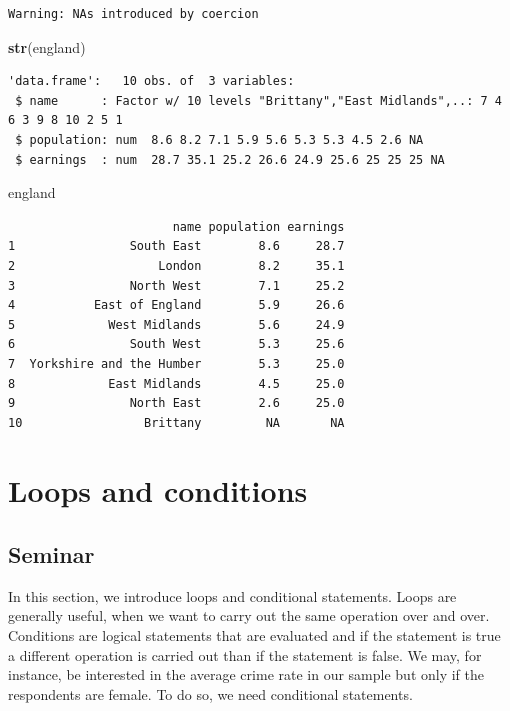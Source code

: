 \documentclass[]{article}
\newenvironment{Shaded}{\begin{snugshade}}{\end{snugshade}}
\newcommand{\KeywordTok}[1]{\textcolor[rgb]{0.13,0.29,0.53}{\textbf{#1}}}
\newcommand{\NormalTok}[1]{#1}
\begin{document}
\begin{verbatim}
Warning: NAs introduced by coercion
\end{verbatim}

\begin{Shaded}
\begin{Highlighting}[]
\KeywordTok{str}\NormalTok{(england)}
\end{Highlighting}
\end{Shaded}

\begin{verbatim}
'data.frame':   10 obs. of  3 variables:
 $ name      : Factor w/ 10 levels "Brittany","East Midlands",..: 7 4 6 3 9 8 10 2 5 1
 $ population: num  8.6 8.2 7.1 5.9 5.6 5.3 5.3 4.5 2.6 NA
 $ earnings  : num  28.7 35.1 25.2 26.6 24.9 25.6 25 25 25 NA
\end{verbatim}

\begin{Shaded}
\begin{Highlighting}[]
\NormalTok{england}
\end{Highlighting}
\end{Shaded}

\begin{verbatim}
                       name population earnings
1                South East        8.6     28.7
2                    London        8.2     35.1
3                North West        7.1     25.2
4           East of England        5.9     26.6
5             West Midlands        5.6     24.9
6                South West        5.3     25.6
7  Yorkshire and the Humber        5.3     25.0
8             East Midlands        4.5     25.0
9                North East        2.6     25.0
10                 Brittany         NA       NA
\end{verbatim}

\hypertarget{loops-and-conditions}{%
\section{Loops and conditions}\label{loops-and-conditions}}

\hypertarget{seminar-4}{%
\subsection{Seminar}\label{seminar-4}}

In this section, we introduce loops and conditional statements. Loops are generally useful, when we want to carry out the same operation over and over. Conditions are logical statements that are evaluated and if the statement is true a different operation is carried out than if the statement is false. We may, for instance, be interested in the average crime rate in our sample but only if the respondents are female. To do so, we need conditional statements.
\end{document}
